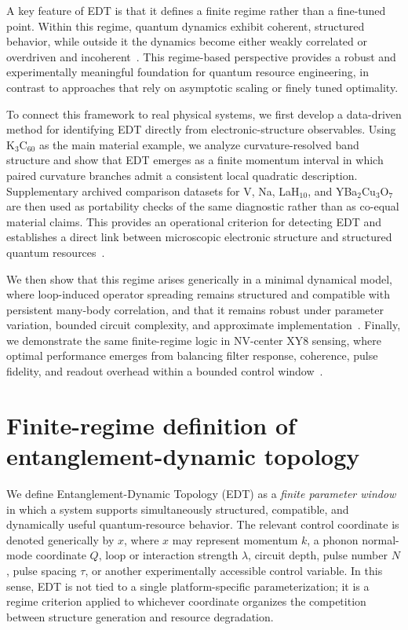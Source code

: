 ﻿\documentclass[aps,prx,reprint,superscriptaddress,longbibliography,floatfix]{revtex4-2}
\begin{document}
A key feature of EDT is that it defines a finite regime rather than a fine-tuned point. Within this regime, quantum dynamics exhibit coherent, structured behavior, while outside it the dynamics become either weakly correlated or overdriven and incoherent~\cite{Larkin1969,Swingle2018}. This regime-based perspective provides a robust and experimentally meaningful foundation for quantum resource engineering, in contrast to approaches that rely on asymptotic scaling or finely tuned optimality.

To connect this framework to real physical systems, we first develop a data-driven method for identifying EDT directly from electronic-structure observables. Using K$_3$C$_{60}$ as the main material example, we analyze curvature-resolved band structure and show that EDT emerges as a finite momentum interval in which paired curvature branches admit a consistent local quadratic description. Supplementary archived comparison datasets for V, Na, LaH$_{10}$, and YBa$_2$Cu$_3$O$_7$ are then used as portability checks of the same diagnostic rather than as co-equal material claims. This provides an operational criterion for detecting EDT and establishes a direct link between microscopic electronic structure and structured quantum resources~\cite{Gunnarsson1997,Capone2009}.

We then show that this regime arises generically in a minimal dynamical model, where loop-induced operator spreading remains structured and compatible with persistent many-body correlation, and that it remains robust under parameter variation, bounded circuit complexity, and approximate implementation~\cite{Lloyd1996,Childs2019}. Finally, we demonstrate the same finite-regime logic in NV-center XY8 sensing, where optimal performance emerges from balancing filter response, coherence, pulse fidelity, and readout overhead within a bounded control window~\cite{Degen2017,Barry2020,Casola2018}.


\section{Finite-regime definition of entanglement-dynamic topology}

We define Entanglement-Dynamic Topology (EDT) as a \emph{finite parameter window} in which a system supports simultaneously structured, compatible, and dynamically useful quantum-resource behavior. The relevant control coordinate is denoted generically by $x$, where $x$ may represent momentum $k$, a phonon normal-mode coordinate $Q$, loop or interaction strength $\lambda$, circuit depth, pulse number $N$, pulse spacing $\tau$, or another experimentally accessible control variable. In this sense, EDT is not tied to a single platform-specific parameterization; it is a regime criterion applied to whichever coordinate organizes the competition between structure generation and resource degradation.
\end{document}
